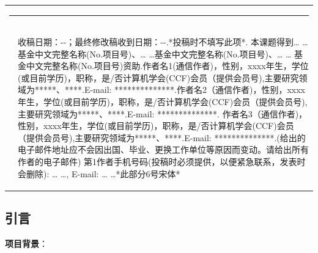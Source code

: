 \documentclass[10.5pt,compsoc]{CjC}
\theoremstyle{mystyle}
\begin{document}
\begin{table}[!t]
\setlength{\tabcolsep}{2pt}
\begin{tabular}{p{0.05cm}p{16.15cm}}
\multicolumn{2}{l}{\rule[4mm]{40mm}{0.1mm}}\\[-3mm]
&\begin{CJK*}{GBK}{gbsn}
收稿日期：\quad \quad -\quad -\quad ；最终修改稿收到日期：\quad \quad -\quad -\quad .*投稿时不填写此项*. 本课题得到… …基金中文完整名称(No.项目号)、… …基金中文完整名称(No.项目号)、… … 基金中文完整名称(No.项目号)资助.作者名1(通信作者)，性别，xxxx年生，学位(或目前学历)，职称，是/否计算机学会(CCF)会员（提供会员号),主要研究领域为*****、****.E-mail: **************.作者名2（通信作者)，性别，xxxx年生，学位(或目前学历)，职称，是/否计算机学会(CCF)会员（提供会员号),主要研究领域为*****、****.E-mail: **************. 作者名3（通信作者)，性别，xxxx年生，学位(或目前学历)，职称，是/否计算机学会(CCF)会员（提供会员号),主要研究领域为*****、****.E-mail: **************.(给出的电子邮件地址应不会因出国、毕业、更换工作单位等原因而变动。请给出所有作者的电子邮件)
第1作者手机号码(投稿时必须提供，以便紧急联系，发表时会删除): … …, E-mail: … …*此部分6号宋体*
\end{CJK*}
\end{tabular}\end{table}
\clearpage\clearpage
\begin{strip}
\vspace {-13mm}
\end{strip}
    \linespread{1.15}
\begin{CJK*}{GBK}{hei}
\vskip 1mm
\section{引言}
\textbf{项目背景}：
\end{CJK*}
\end{document}
